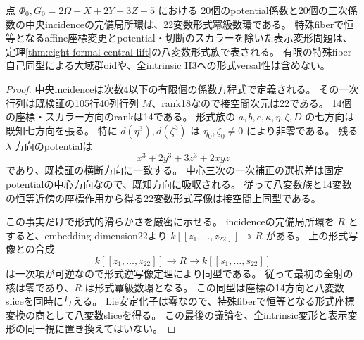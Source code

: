 \begin{theorem}[指定表示incidenceの形式的滑らかさ]
\label{thm:formal-potential-incidence-smooth}
点 $\Phi_0,G_0=2\Omega+X+2Y+3Z+5$ における
20個のpotential係数と20個の三次係数の中央incidenceの完備局所環は、22変数形式冪級数環である。
特殊fiberで恒等となるaffine座標変更とpotential・切断のスカラーを除いた表示変形問題は、
定理\ref{thm:eight-formal-central-lift}の八変数形式族で表される。
有限の特殊fiber自己同型による大域群oidや、全intrinsic H3への形式versal性は含めない。
\end{theorem}
\begin{proof}
中央incidenceは次数4以下の有限個の係数方程式で定義される。
その一次行列は既検証の105行40列行列 $M$、rank18なので接空間次元は22である。
14個の座標・スカラー方向のrankは14である。
形式族の $a,b,c,\kappa,\eta,\zeta,D$ の七方向は既知七方向を張る。
特に $d(\eta^3),d(\zeta^3)$ は $\eta_0,\zeta_0\ne0$ により非零である。
残る $\lambda$ 方向のpotentialは
\[
 x^3+2y^3+3z^3+2xyz
\]
であり、既検証の横断方向に一致する。
中心三次の一次補正の選択差は固定potentialの中心方向なので、既知方向に吸収される。
従って八変数族と14変数の恒等近傍の座標作用から得る22変数形式写像は接空間上同型である。

この事実だけで形式的滑らかさを厳密に示せる。
incidenceの完備局所環を $R$ とすると、embedding dimension22より
$k[[z_1,\ldots,z_{22}]]\twoheadrightarrow R$ がある。
上の形式写像との合成
\[
 k[[z_1,\ldots,z_{22}]]\longrightarrow R\longrightarrow k[[s_1,\ldots,s_{22}]]
\]
は一次項が可逆なので形式逆写像定理により同型である。
従って最初の全射の核は零であり、$R$ は形式冪級数環となる。
この同型は座標の14方向と八変数sliceを同時に与える。
Lie安定化子は零なので、特殊fiberで恒等となる形式座標変換の商として八変数sliceを得る。
この最後の議論を、全intrinsic変形と表示変形の同一視に置き換えてはいない。
\end{proof}
